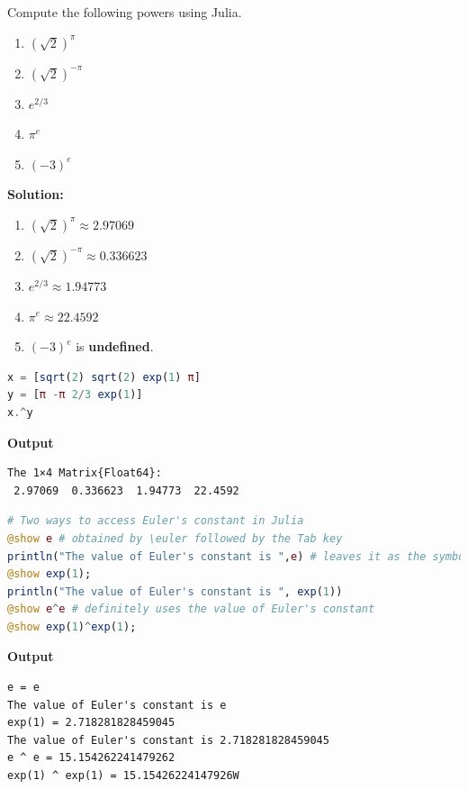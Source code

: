 \begin{example} Compute the following powers using Julia.
\begin{enumerate}
\renewcommand{\labelenumi}{(\alph{enumi})}
\setlength{\itemsep}{.2cm}
\item $\left( \sqrt{2} \right)^\pi$
\item $\left(\sqrt{2}\right)^{-\pi}$
\item $e^{2/3}$
\item $\pi^e$
\item $\left(-3 \right)^{e}$
\end{enumerate}    
\end{example}

\textbf{Solution:}

\begin{enumerate}
\renewcommand{\labelenumi}{(\alph{enumi})}
\setlength{\itemsep}{.2cm}
\item $\left( \sqrt{2} \right)^\pi \approx  2.97069 $
\item $\left(\sqrt{2}\right)^{-\pi}  \approx  0.336623$
\item $e^{2/3}  \approx   1.94773  $
\item $\pi^e  \approx  22.4592$
\item $\left(-3 \right)^{e}$ is \textbf{undefined}.
\end{enumerate}  

\begin{lstlisting}[language=Julia,style=mystyle]
x = [sqrt(2) sqrt(2) exp(1) π]
y = [π -π 2/3 exp(1)]
x.^y
\end{lstlisting}
\textbf{Output} 
\begin{verbatim}
The 1×4 Matrix{Float64}:
 2.97069  0.336623  1.94773  22.4592
\end{verbatim}

\begin{lstlisting}[language=Julia,style=mystyle]
# Two ways to access Euler's constant in Julia
@show e # obtained by \euler followed by the Tab key
println("The value of Euler's constant is ",e) # leaves it as the symbol e
@show exp(1);
println("The value of Euler's constant is ", exp(1))
@show e^e # definitely uses the value of Euler's constant
@show exp(1)^exp(1);
\end{lstlisting}
\textbf{Output} 
\begin{verbatim}
e = e
The value of Euler's constant is e
exp(1) = 2.718281828459045
The value of Euler's constant is 2.718281828459045
e ^ e = 15.154262241479262
exp(1) ^ exp(1) = 15.15426224147926W
\end{verbatim}

